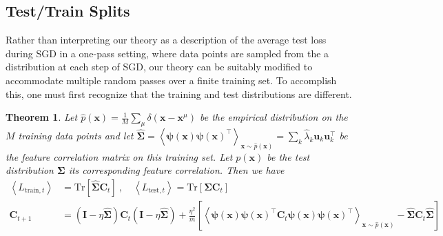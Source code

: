 \documentclass{article} %
\def\x{\bm x}
\newtheorem{theorem}{Theorem}
\def\x{\mathbf x}
\def\A{\mathbf A}
\def\u{\mathbf u}
\def\I{\mathbf I}
\def\C{\mathbf C}
\begin{document}

\subsection{Test/Train Splits}\label{sec:test_train_split}
Rather than interpreting our theory as a description of the average test loss during SGD in a one-pass setting, where data points are sampled from the a distribution at each step of SGD, our theory can be suitably modified to accommodate multiple random passes over a finite training set. To accomplish this, one must first recognize that the training and test distributions are different. 
\begin{theorem}\label{thm_test_train_split}
Let $\hat{p}(\x) = \frac{1}{M} \sum_\mu \delta(\x-\x^\mu)$ be the empirical distribution on the $M$ training data points and let $\bm{\hat\Sigma} = \left< \bm\psi(\x) \bm\psi(\x)^\top \right>_{\x\sim\hat{p}(\x)} = \sum_k \hat{\lambda}_k \u_k \u_k^\top $ be the feature correlation matrix on this training set. Let $p(\x)$ be the test distribution $\bm\Sigma$ its corresponding feature correlation. Then we have
\begin{align}
   \left< L_{\text{train}, t} \right> &= \text{Tr}\left[  \hat{\bm \Sigma} \C_t \right] \ , \quad \left< L_{\text{test}, t} \right> = \text{Tr}\left[ \bm\Sigma \C_t \right] \nonumber 
   \\
   \C_{t+1} &= (\I - \eta \bm{\hat\Sigma}) \C_t (\I - \eta \bm{\hat \Sigma} ) + \frac{\eta^2}{m}\left[\left< \bm\psi(\x) \bm\psi(\x)^\top \C_t \bm\psi(\x) \bm\psi(\x)^\top \right>_{\x\sim \hat{p}(\x)} - \bm{\hat\Sigma} \C_t \bm{\hat\Sigma} \right]
\end{align}
\end{theorem}
\end{document}
